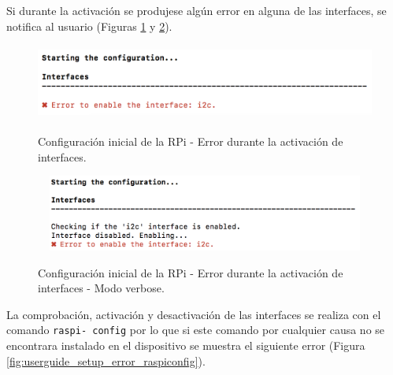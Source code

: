 \documentclass[12pt,a4paper, twoside]{report}
\begin{document}
	Si durante la activación se produjese algún error en alguna de las interfaces, se notifica al usuario (Figuras \ref{fig:userguide_setup_error_enableinterface} y \ref{fig:userguide_setup_error_enableinterface_verbose}).

	\begin{figure}[!ht]   
		\caption{Configuración inicial de la RPi - Error durante la activación de interfaces.} 
		\begin{center} 
			\includegraphics[width=12cm,height=2.5cm]{Images/userGuide/setup/enableInterfaceError} \\
			\label{fig:userguide_setup_error_enableinterface} 
		\end{center}  
	\end{figure}
	
	\begin{figure}[!ht]   
		\caption{Configuración inicial de la RPi - Error durante la activación de interfaces - Modo verbose.} 
		\begin{center} 
			\includegraphics[width=12cm,height=2.5cm]{Images/userGuide/setup/enableInterfaceVerboseError.png} \\
			\label{fig:userguide_setup_error_enableinterface_verbose} 
		\end{center}  
	\end{figure}
	
	La comprobación, activación y desactivación de las interfaces se realiza con el comando \texttt{raspi- config} por lo que si este comando por cualquier causa no se encontrara instalado en el dispositivo se muestra el siguiente error (Figura \ref{fig:userguide_setup_error_raspiconfig}).

	\newpage
	
\end{document}

